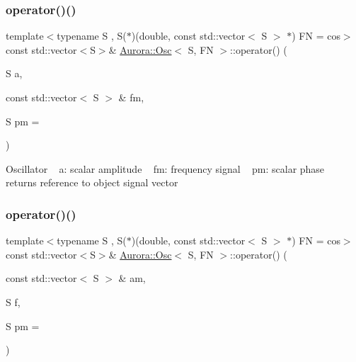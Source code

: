 \subsubsection{\texorpdfstring{operator()()}{operator()()}\hspace{0.1cm}{\footnotesize\ttfamily [2/6]}}
{\footnotesize\ttfamily template$<$typename S , S($\ast$)(double, const std\+::vector$<$ S $>$ $\ast$) FN = cos$>$ \\
const std\+::vector$<$S$>$\& \hyperlink{class_aurora_1_1_osc}{Aurora\+::\+Osc}$<$ S, FN $>$\+::operator() (\begin{DoxyParamCaption}\item[{S}]{a,  }\item[{const std\+::vector$<$ S $>$ \&}]{fm,  }\item[{S}]{pm = {} }\end{DoxyParamCaption})\hspace{0.3cm}{\ttfamily [inline]}}

Oscillator ~\newline
a\+: scalar amplitude ~\newline
fm\+: frequency signal ~\newline
pm\+: scalar phase ~\newline
returns reference to object signal vector \mbox{\label{class_aurora_1_1_osc_ad5d820889253afd837b103843d2fd7ad}} 
\subsubsection{\texorpdfstring{operator()()}{operator()()}\hspace{0.1cm}{\footnotesize\ttfamily [3/6]}}
{\footnotesize\ttfamily template$<$typename S , S($\ast$)(double, const std\+::vector$<$ S $>$ $\ast$) FN = cos$>$ \\
const std\+::vector$<$S$>$\& \hyperlink{class_aurora_1_1_osc}{Aurora\+::\+Osc}$<$ S, FN $>$\+::operator() (\begin{DoxyParamCaption}\item[{const std\+::vector$<$ S $>$ \&}]{am,  }\item[{S}]{f,  }\item[{S}]{pm = {} }\end{DoxyParamCaption})\hspace{0.3cm}{\ttfamily [inline]}}

